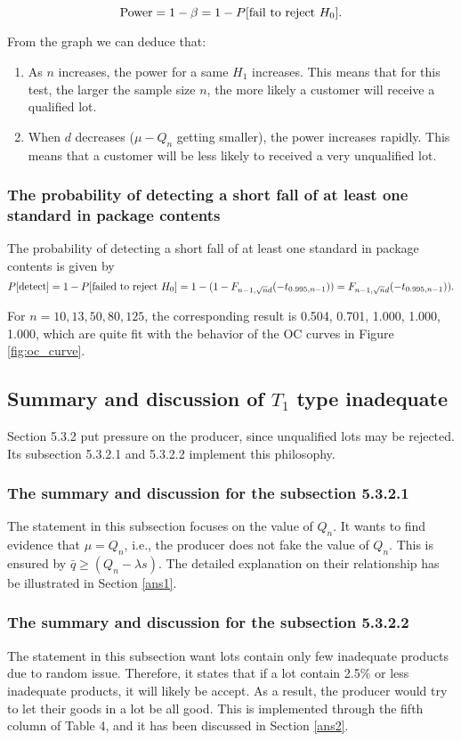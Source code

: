 \documentclass[conf]{new-aiaa}
\begin{document}
$${\rm  Power}=1-\beta=1-P[{\rm fail\ to\ reject\ }H_0].$$

From the graph we can deduce that:
\begin{enumerate}
    \item As $n$ increases, the power for a same $H_1$ increases. This means that for this test, the larger the sample size $n$, the more likely a customer will receive a qualified lot.
    \item When $d$ decreases ($\mu - Q_n$ getting smaller), the power increases rapidly. This means that a customer will be less likely to received a very unqualified lot.
\end{enumerate}

\subsubsection{The probability of detecting a short fall of at least one standard in package contents}

The probability of detecting a short fall of at least one standard in package contents is given by
$$P[{\rm detect}]=1-P[{\rm failed\ to\ reject\ }H_0]= 1 - (1- F_{n-1, \sqrt{n}d}(-t_{0.995, n-1}))=F_{n-1, \sqrt{n}d}(-t_{0.995, n-1})).$$

For $n=10, 13, 50, 80 ,125$, the corresponding result is 0.504, 0.701, 1.000, 1.000, 1.000, which are quite fit with the behavior of the OC curves in Figure \ref{fig:oc_curve}.

\subsection{Summary and discussion of $T_1$ type inadequate}
Section 5.3.2 put pressure on the producer, since unqualified lots may be rejected. Its subsection 5.3.2.1 and 5.3.2.2 implement this philosophy.

\subsubsection{The summary and discussion for the subsection 5.3.2.1}
The statement in this subsection focuses on the value of $Q_n$. It wants to find evidence that $\mu = Q_n$, i.e., the producer does not fake the value of $Q_n$. This is ensured by $\bar{q} \geqslant (Q_n - \lambda s)$. The detailed explanation on their relationship has be illustrated in Section \ref{ans1}.

\subsubsection{The summary and discussion for the subsection 5.3.2.2}
The statement in this subsection want lots contain only few inadequate products due to random issue. Therefore, it states that if a lot contain 2.5\% or less inadequate products, it will likely be accept. As a result, the producer would try to let their goods in a lot be all good. This is implemented through the fifth column of Table 4, and it has been discussed in Section \ref{ans2}.
\end{document}
